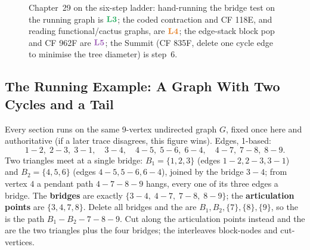 \begin{figure}[H]
\centering
{}
\caption{Chapter~29 on the six-step ladder: hand-running the bridge test on the
running graph is \(\lv3\); the coded contraction and CF 118E, and reading
functional/cactus graphs, are \(\lv4\); the edge-stack block pop and CF 962F are
\(\lv5\); the Summit (CF 835F, delete one cycle edge to minimise the tree
diameter) is step~6.}
\end{figure}

\subsection*{The Running Example: A Graph With Two Cycles and a Tail}

Every section runs on the same 9-vertex undirected graph \(G\), fixed once here
and authoritative (if a later trace disagrees, this figure wins).  Edges, 1-based:
\[
  1\!-\!2,\; 2\!-\!3,\; 3\!-\!1,\quad
  3\!-\!4,\quad
  4\!-\!5,\; 5\!-\!6,\; 6\!-\!4,\quad
  4\!-\!7,\; 7\!-\!8,\; 8\!-\!9 .
\]
Two triangles meet at a single bridge: \(B_1=\{1,2,3\}\) (edges
\(1\!-\!2,2\!-\!3,3\!-\!1\)) and \(B_2=\{4,5,6\}\) (edges
\(4\!-\!5,5\!-\!6,6\!-\!4\)), joined by the bridge \(3\!-\!4\); from vertex \(4\)
a pendant path \(4\!-\!7\!-\!8\!-\!9\) hangs, every one of its three edges a
bridge.  The \textbf{bridges} are exactly \(\{3\!-\!4,\;4\!-\!7,\;7\!-\!8,\;8\!-\!9\}\);
the \textbf{articulation points} are \(\{3,4,7,8\}\).  Delete all bridges and the
 are \(B_1,B_2,\{7\},\{8\},\{9\}\), so the
 is the path \(B_1\!-\!B_2\!-\!7\!-\!8\!-\!9\).  Cut along the
articulation points instead and the  are the two triangles plus the
four bridges; the  interleaves block-nodes and cut-vertices.


